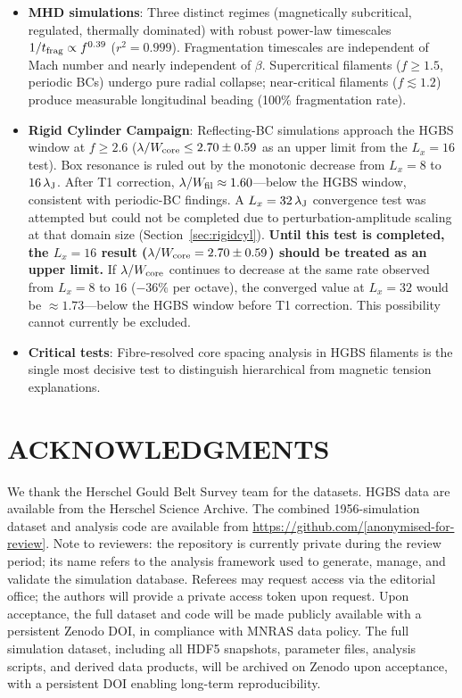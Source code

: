 \documentclass[twoside,twocolumn]{mnras}
\begin{document}
\begin{itemize}
    \item \textbf{MHD simulations}: Three distinct regimes (magnetically subcritical,
    regulated, thermally dominated) with robust power-law timescales
    $1/t_{\rm frag} \propto f^{0.39}$ ($r^2 = 0.999$). Fragmentation timescales are
    independent of Mach number and nearly independent of $\beta$. Supercritical filaments
    ($f \geq 1.5$, periodic BCs) undergo pure radial collapse; near-critical filaments
    ($f \lesssim 1.2$) produce measurable longitudinal beading (100\% fragmentation rate).

    \item \textbf{Rigid Cylinder Campaign}: Reflecting-BC simulations approach the HGBS window at $f \geq 2.6$ ($\lambda/W_{\rm core} \leq 2.70 \pm 0.59$ as an upper limit from the $L_x=16$ test). Box resonance is
    ruled out by the monotonic decrease from $L_x = 8$ to $16\,\lambda_{\rm J}$.
    After T1 correction, $\lambda/W_{\rm fil} \approx 1.60$---below the HGBS window,
    consistent with periodic-BC findings. A $L_x = 32\,\lambda_{\rm J}$ convergence test was attempted but could not be completed due to perturbation-amplitude scaling at that domain size (Section~\ref{sec:rigidcyl}). \textbf{Until this test is completed, the $L_x = 16$ result ($\lambda/W_{\rm core} = 2.70 \pm 0.59$) should be treated as an upper limit.} If $\lambda/W_{\rm core}$ continues to decrease at the same rate observed from $L_x = 8$ to $16$ ($-36\%$ per octave), the converged value at $L_x = 32$ would be $\approx 1.73$---below the HGBS window before T1 correction. This possibility cannot currently be excluded.

    \item \textbf{Critical tests}: Fibre-resolved core spacing analysis in HGBS
    filaments is the single most decisive test to distinguish hierarchical from magnetic
    tension explanations.

\end{itemize}

\section*{ACKNOWLEDGMENTS}

We thank the Herschel Gould Belt Survey team for the datasets. HGBS data are available
from the Herschel Science Archive. The combined 1956-simulation dataset and analysis code are available from
\url{https://github.com/[anonymised-for-review]}. Note to reviewers: the repository is currently private during the review period; its name refers to the analysis framework used to generate, manage, and validate the simulation database.
Referees may request access via the editorial office; the authors will provide a
private access token upon request. Upon acceptance, the full dataset and code will
be made publicly available with a persistent Zenodo DOI, in compliance with MNRAS
data policy. The full simulation
dataset, including all HDF5 snapshots, parameter files, analysis scripts, and derived
data products, will be archived on Zenodo upon acceptance, with a persistent DOI enabling
long-term reproducibility.



\end{document}
